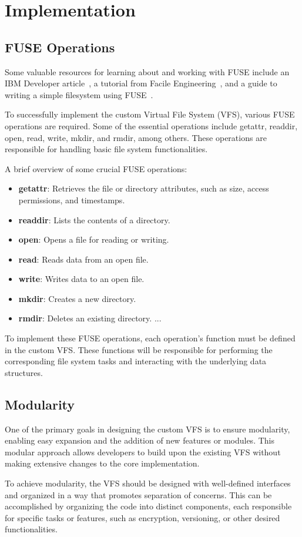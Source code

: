 \chapter{Implementation}
\label{chap:implementation}

\section{FUSE Operations}\label{sec:fuse-ops}

Some valuable resources for learning about and working with FUSE include an IBM Developer article~\cite{ibm_fuse}, a tutorial from Facile Engineering~\cite{facile_fuse}, and a guide to writing a simple filesystem using FUSE~\cite{maastaar_fuse}.

To successfully implement the custom Virtual File System (VFS), various FUSE operations are required.
Some of the essential operations include getattr, readdir, open, read, write, mkdir, and rmdir, among others.
These operations are responsible for handling basic file system functionalities.

A brief overview of some crucial FUSE operations:

\begin{itemize}
    \item \textbf{getattr}: Retrieves the file or directory attributes, such as size, access permissions, and timestamps.
    \item \textbf{readdir}: Lists the contents of a directory.
    \item \textbf{open}: Opens a file for reading or writing.
    \item \textbf{read}: Reads data from an open file.
    \item \textbf{write}: Writes data to an open file.
    \item \textbf{mkdir}: Creates a new directory.
    \item \textbf{rmdir}: Deletes an existing directory.
    ...
\end{itemize}

To implement these FUSE operations, each operation's function must be defined in the custom VFS.
These functions will be responsible for performing the corresponding file system tasks and interacting with the underlying data structures.



\section{Modularity}\label{sec:modularity}

One of the primary goals in designing the custom VFS is to ensure modularity, enabling easy expansion and the addition of new features or modules.
This modular approach allows developers to build upon the existing VFS without making extensive changes to the core implementation.

To achieve modularity, the VFS should be designed with well-defined interfaces and organized in a way that promotes separation of concerns.
This can be accomplished by organizing the code into distinct components, each responsible for specific tasks or features, such as encryption, versioning, or other desired functionalities.